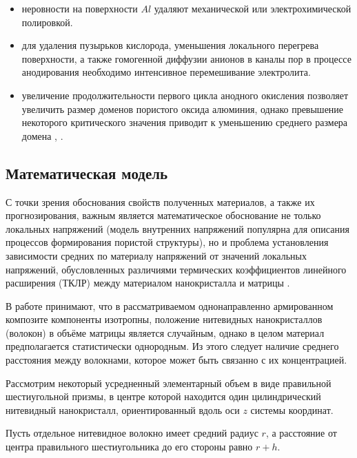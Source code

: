 \begin{itemize}
    \item неровности на поверхности $Al$ удаляют механической или электрохимической полировкой.
    \item для удаления пузырьков кислорода, уменьшения локального перегрева поверхности, а также гомогенной диффузии анионов в каналы пор в процессе анодирования необходимо интенсивное перемешивание электролита.
    \item увеличение продолжительности первого цикла анодного окисления позволяет увеличить размер доменов пористого оксида алюминия, однако превышение некоторого критического значения приводит к уменьшению среднего размера домена \cite{napolsky-sintez}, \cite{petukhov}.
\end{itemize}

\subsection{Математическая модель}

С точки зрения обоснования свойств полученных материалов, а также их прогнозирования, важным является математическое обоснование не только локальных напряжений (модель внутренних напряжений популярна для описания процессов формирования пористой структуры), но и проблема установления зависимости средних по материалу напряжений от значений локальных напряжений, обусловленных различиями термических коэффициентов линейного расширения (ТКЛР) между материалом нанокристалла и матрицы \cite{gasenkova}.

В работе \cite{gasenkova} принимают, что в рассматриваемом однонаправленно армированном композите компоненты изотропны, положение нитевидных нанокристаллов (волокон) в объёме матрицы является случайным, однако в целом материал предполагается статистически однородным. Из этого следует наличие среднего расстояния между волокнами, которое может быть связанно с их концентрацией.

Рассмотрим некоторый усредненный элементарный объем в виде правильной шестиугольной призмы, в центре которой находится один цилиндрический нитевидный нанокристалл, ориентированный вдоль оси $z$ системы координат.

Пусть отдельное нитевидное волокно имеет средний радиус $r$, а расстояние от центра правильного шестиугольника до его стороны равно $r+h$.

